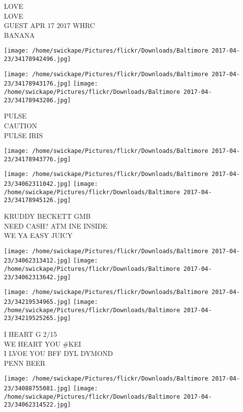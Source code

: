 \documentclass[10pt,letterpaper]{article}
\begin{document}
LOVE\\
LOVE\\
GUEST APR 17 2017 WHRC\\
BANANA\\
\pagebreak

\texttt{[image: /home/swickape/Pictures/flickr/Downloads/Baltimore 2017-04-23/34178942496.jpg]}

\vspace{0.25in}
\texttt{[image: /home/swickape/Pictures/flickr/Downloads/Baltimore 2017-04-23/34178943176.jpg]}
\texttt{[image: /home/swickape/Pictures/flickr/Downloads/Baltimore 2017-04-23/34178943286.jpg]}

PULSE\\
CAUTION\\
PULSE IRIS\\
\pagebreak

\texttt{[image: /home/swickape/Pictures/flickr/Downloads/Baltimore 2017-04-23/34178943776.jpg]}

\vspace{0.25in}
\texttt{[image: /home/swickape/Pictures/flickr/Downloads/Baltimore 2017-04-23/34062311042.jpg]}
\texttt{[image: /home/swickape/Pictures/flickr/Downloads/Baltimore 2017-04-23/34178945126.jpg]}

KRUDDY BECKETT GMB\\
NEED CASH?  ATM INE INSIDE\\
WE YA EASY JUICY\\
\pagebreak

\texttt{[image: /home/swickape/Pictures/flickr/Downloads/Baltimore 2017-04-23/34062313412.jpg]}
\texttt{[image: /home/swickape/Pictures/flickr/Downloads/Baltimore 2017-04-23/34062313642.jpg]}

\texttt{[image: /home/swickape/Pictures/flickr/Downloads/Baltimore 2017-04-23/34219534965.jpg]}
\texttt{[image: /home/swickape/Pictures/flickr/Downloads/Baltimore 2017-04-23/34219525265.jpg]}

I HEART G 2/15\\
WE HEART YOU \#KEI\\
I LVOE YOU BFF DYL DYMOND\\
PENN BEER\\
\pagebreak

\texttt{[image: /home/swickape/Pictures/flickr/Downloads/Baltimore 2017-04-23/34088755081.jpg]}
\texttt{[image: /home/swickape/Pictures/flickr/Downloads/Baltimore 2017-04-23/34062314522.jpg]}
\end{document}
